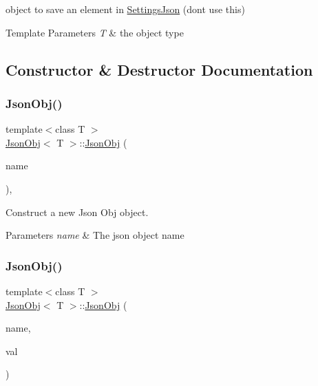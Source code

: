 object to save an element in \hyperlink{class_settings_json}{Settings\+Json} (dont use this) 


\begin{DoxyTemplParams}{Template Parameters}
{\em T} & the object type \\
\hline
\end{DoxyTemplParams}


\subsection{Constructor \& Destructor Documentation}
\mbox{\label{class_json_obj_af6841346388fac1a1d07f804412ef1ae}} 
\subsubsection{\texorpdfstring{Json\+Obj()}{JsonObj()}\hspace{0.1cm}{\footnotesize\ttfamily [1/3]}}
{\footnotesize\ttfamily template$<$class T $>$ \\
\hyperlink{class_json_obj}{Json\+Obj}$<$ T $>$\+::\hyperlink{class_json_obj}{Json\+Obj} (\begin{DoxyParamCaption}\item[{std\+::string const \&}]{name }\end{DoxyParamCaption})\hspace{0.3cm}{\ttfamily [inline]}, {\ttfamily [explicit]}}



Construct a new Json Obj object. 


\begin{DoxyParams}{Parameters}
{\em name} & The json object name \\
\hline
\end{DoxyParams}
\mbox{\label{class_json_obj_a850a00361030aaa5516b7f4ba788b475}} 
\subsubsection{\texorpdfstring{Json\+Obj()}{JsonObj()}\hspace{0.1cm}{\footnotesize\ttfamily [2/3]}}
{\footnotesize\ttfamily template$<$class T $>$ \\
\hyperlink{class_json_obj}{Json\+Obj}$<$ T $>$\+::\hyperlink{class_json_obj}{Json\+Obj} (\begin{DoxyParamCaption}\item[{std\+::string const \&}]{name,  }\item[{T const \&}]{val }\end{DoxyParamCaption})\hspace{0.3cm}{\ttfamily [inline]}}



